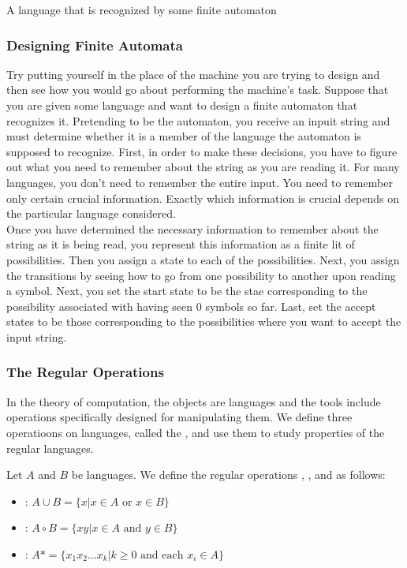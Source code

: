 \documentclass{article}
\begin{document}
\begin{definition} 
  A language that is recognized by some finite automaton
\end{definition}

\subsubsection{Designing Finite Automata}

Try putting yourself in the place of the machine you are trying to design and then see how you would go about performing the machine's task. Suppose that you are given some language and want to design a finite automaton that recognizes it. Pretending to be the automaton, you receive an inpuit string and must determine whether it is a member of the language the automaton is supposed to recognize. First, in order to make these decisions, you have to figure out what you need to remember about the string as you are reading it. For many languages, you don't need to remember the entire input. You need to remember only certain crucial information. Exactly which information is crucial depends on the particular language considered. \\ 

Once you have determined the necessary information to remember about the string as it is being read, you represent this information as a finite lit of possibilities. Then you assign a state to each of the possibilities. Next, you assign the transitions by seeing how to go from one possibility to another upon reading a symbol. Next, you set the start state to be the stae corresponding to the possibility associated with having seen 0 symbols so far. Last, set the accept states to be those corresponding to the possibilities where you want to accept the input string. 

\subsubsection{The Regular Operations}

In the theory of computation, the objects are languages and the tools include operations specifically designed for manipulating them. We define three operatioons on languages, called the , and use them to study properties of the regular languages. 

\begin{define}
  Let $A$ and $B$ be languages. We define the regular operations , , and  as follows:
  \begin{itemize}
    \item {}: $A \cup B = \{x  \vert x \in A \textrm{ or } x \in B \}$ 
    \item {}: $A \circ B = \{xy \vert x \in A \textrm{ and } y \in B \}$ 
    \item {}: $A* = \{x_{1}x_{2} \dots x_{k} \vert k \geq 0 \textrm{ and each } x_{i} \in A \}$
  \end{itemize}
\end{define}
\end{document}
